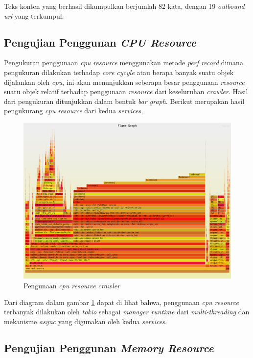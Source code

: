 Teks konten yang berhasil dikumpulkan berjumlah 82 kata, dengan 19 \emph{outbound url} yang terkumpul.

\subsection{Pengujian Penggunan \emph{CPU Resource}}

Pengukuran penggunaan \emph{cpu resource} menggunakan metode \emph{perf record} dimana pengukuran dilakukan terhadap \emph{core cycyle} atau berapa banyak suatu objek dijalankan oleh \emph{cpu}, ini akan menunjukkan seberapa besar penggunaan \emph{resource} suatu objek relatif terhadap penggunaan \emph{resource} dari keseluruhan \emph{crawler}. Hasil dari pengukuran ditunjukkan dalam bentuk \emph{bar graph}. Berikut merupakan hasil pengukurang \emph{cpu resource} dari kedua \emph{services},

\begin{figure}[H]
  \centering
  \includegraphics[keepaspectratio, width=14cm]{gambar/graph/cpu-bench-parser.png}
  \caption{Pengunaan \emph{cpu resource} \emph{crawler}}
  \label{gambar:cpu-bench-parser}
\end{figure}

Dari diagram dalam gambar \ref{gambar:cpu-bench-parser} dapat di lihat bahwa, penggunaan \emph{cpu resource} terbanyak dilakukan oleh \emph{tokio} sebagai \emph{manager runtime} dari \emph{multi-threading} dan mekanisme \emph{async} yang digunakan oleh kedua \emph{services}.

\subsection{Pengujian Penggunan \emph{Memory Resource}}


